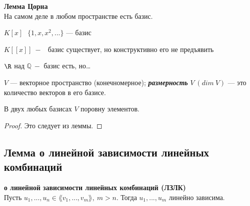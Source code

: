 \begin{remark} \textbf{Лемма Цорна} \\
    На самом деле в любом пространстве есть базис.
\end{remark}

\begin{example}
    $K[x]\ \ \ \{1, x, x^2, ...\}$ — базис

    $K[[x]]\ -$  базис существует, но конструктивно его не предъявить

    $\R$ над $\mathbb{Q}\ -$ базис есть, но…
\end{example}

\begin{definition}
     $V$ — векторное пространство (конечномерное); 
\textbf{\textit{размерность}} $V\ (dim\ V)$  — это количество векторов в 
его базисе.
\end{definition}

\begin{theorem}
    В двух любых базисах $V$ поровну элементов.
\end{theorem}

 \begin{proof}
    Это следует из леммы.
 \end{proof}

 \subsection{Лемма о линейной зависимости линейных комбинаций}

\begin{lemma} \textbf{о линейной зависимости линейных комбинаций (ЛЗЛК)} 
\\
    Пусть $u_1,...,u_n\in \lang v_1,...,v_m\rang, \ m>n$. Тогда 
$u_1,...,u_m$ линейно зависима.
\end{lemma}

